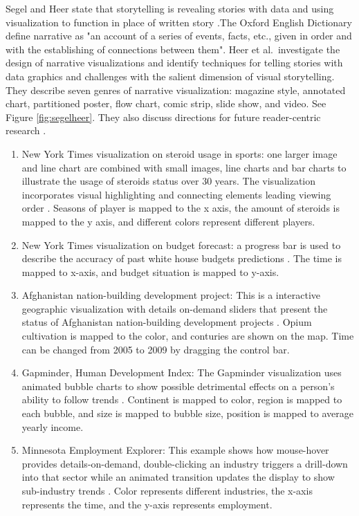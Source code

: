 \documentclass{egpubl}
\begin{document}
 Segel and Heer state that storytelling  is revealing stories with data and using visualization to function in place of written story \cite{segal}.The Oxford English Dictionary define narrative as "an account of a series of events, facts, etc., given in order and with the establishing of connections between them". 
Heer et al.\ investigate the design of narrative visualizations and identify techniques for telling stories with data graphics and challenges with the salient dimension of visual storytelling. They describe seven genres of narrative visualization: magazine style, annotated chart, partitioned poster, flow chart, comic strip, slide show, and video. See Figure \ref{fig:segelheer}. They also discuss directions for future reader-centric research \cite{Heer1}.
\begin{enumerate}
\item New York Times visualization on steroid usage in sports: one larger image and line chart are combined with small images, line charts and bar charts to illustrate the usage of steroids status over 30 years. The visualization incorporates visual highlighting and connecting elements leading viewing order \cite{steroids}. Seasons of player is mapped to the x axis, the amount of steroids is mapped to the y axis, and different colors represent different players.
\item New York Times visualization on budget forecast: a progress bar is used to describe the accuracy of past white house budgets predictions \cite{budget}. The time is mapped to x-axis, and budget situation is mapped to y-axis.
\item Afghanistan nation-building development project: This is a interactive geographic visualization with details on-demand sliders that present the status of Afghanistan nation-building development projects \cite{afghanistan}. Opium cultivation is mapped to the color, and conturies are shown on the map. Time can be changed from 2005 to 2009 by dragging the control bar.
\item Gapminder, Human Development Index: The Gapminder visualization uses animated bubble charts to show possible detrimental effects on a person's ability to follow trends \cite{gapminder2}. Continent is mapped to color, region is mapped to each bubble, and size is mapped to bubble size, position is mapped to average yearly income.
\item Minnesota Employment Explorer: This example shows how mouse-hover provides details-on-demand, double-clicking an industry triggers a drill-down into that sector while an animated transition updates the display to show sub-industry trends \cite{heer2}. Color represents different industries, the x-axis represents the time, and the y-axis represents employment.
\end{enumerate}
\end{document}
